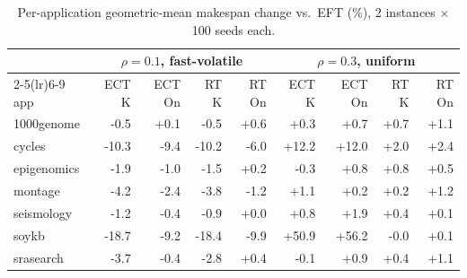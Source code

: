 \begin{table}[t]\centering\scriptsize
\caption{Per-application geometric-mean makespan change vs.\ EFT (\%), 2 instances $\times$ 100 seeds each.}\label{tab:apps}
\setlength{\tabcolsep}{2.5pt}\begin{tabular}{l rrrr rrrr}
\toprule
 & \multicolumn{4}{c}{$\rho=0.1$, fast-volatile} & \multicolumn{4}{c}{$\rho=0.3$, uniform}\\\cmidrule(lr){2-5}\cmidrule(lr){6-9}
app & ECT K & ECT On & RT K & RT On & ECT K & ECT On & RT K & RT On\\
\midrule
1000genome & -0.5 & +0.1 & -0.5 & +0.6 & +0.3 & +0.7 & +0.7 & +1.1\\
cycles & -10.3 & -9.4 & -10.2 & -6.0 & +12.2 & +12.0 & +2.0 & +2.4\\
epigenomics & -1.9 & -1.0 & -1.5 & +0.2 & -0.3 & +0.8 & +0.8 & +0.5\\
montage & -4.2 & -2.4 & -3.8 & -1.2 & +1.1 & +0.2 & +0.2 & +1.2\\
seismology & -1.2 & -0.4 & -0.9 & +0.0 & +0.8 & +1.9 & +0.4 & +0.1\\
soykb & -18.7 & -9.2 & -18.4 & -9.9 & +50.9 & +56.2 & -0.0 & +0.1\\
srasearch & -3.7 & -0.4 & -2.8 & +0.4 & -0.1 & +0.9 & +0.4 & +1.1\\
\bottomrule\end{tabular}\end{table}